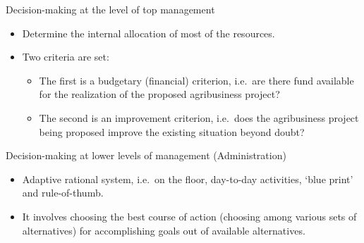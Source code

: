 \documentclass[12pt,ignorenonframetext,aspectratio=169]{beamer}
\providecommand{\tightlist}{%
  \setlength{\itemsep}{0pt}\setlength{\parskip}{0pt}}
\begin{document}
\begin{frame}{Decision-making at the level of top management}
\protect\hypertarget{decision-making-at-the-level-of-top-management}{}
\begin{itemize}
\tightlist
\item
  Determine the internal allocation of most of the resources.
\item
  Two criteria are set:

  \begin{itemize}
  \tightlist
  \item
    The first is a budgetary (financial) criterion, i.e.~are there fund
    available for the realization of the proposed agribusiness project?
  \item
    The second is an improvement criterion, i.e.~does the agribusiness
    project being proposed improve the existing situation beyond doubt?
  \end{itemize}
\end{itemize}
\end{frame}

\begin{frame}{Decision-making at lower levels of management
(Administration)}
\protect\hypertarget{decision-making-at-lower-levels-of-management-administration}{}
\begin{itemize}
\tightlist
\item
  Adaptive rational system, i.e.~on the floor, day-to-day activities,
  `blue print' and rule-of-thumb.
\item
  It involves choosing the best course of action (choosing among various
  sets of alternatives) for accomplishing goals out of available
  alternatives.
\end{itemize}
\end{frame}
\end{document}
